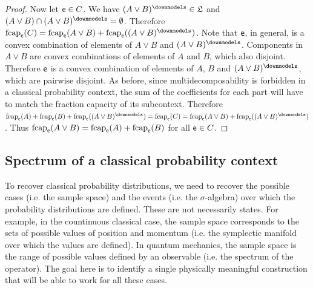 \begin{mathSection}
\begin{proof}
	Now let $\mathsf{e} \in C$. We have $(A \vee B)^\separate \in \mathfrak{L}$ and $(A \vee B) \cap (A \vee B)^\separate = \emptyset$. Therefore $\fcap_{\ens}(C) = \fcap_{\ens}(A \vee B)+ \fcap_{\ens}((A \vee B)^\separate)$. Note that $\mathsf{e}$, in general, is a convex combination of elements of $A\vee B$ and $(A \vee B)^\separate$. Components in $A \vee B$ are convex combinations of elements of $A$ and $B$, which also disjoint. Therefore $\mathsf{e}$ is a convex combination of elements of $A$, $B$ and $(A \vee B)^\separate$, which are pairwise disjoint. As before, since multidecomposability is forbidden in a classical probability context, the sum of the coefficients for each part will have to match the fraction capacity of its subcontext. Therefore $\fcap_{\ens}(A) +  \fcap_{\ens}(B) + \fcap_{\ens}((A \vee B)^\separate) = \fcap_{\ens}(C) = \fcap_{\ens}(A \vee B) + \fcap_{\ens}((A \vee B)^\separate)$. Thus $\mathrm{fcap}_{\mathsf{e}}(A \vee B) = \mathrm{fcap}_{\mathsf{e}}(A) +  \mathrm{fcap}_{\mathsf{e}}(B)$ for all $\mathsf{e} \in C$.
\end{proof}
\end{mathSection}

\subsection{Spectrum of a classical probability context}

To recover classical probability distributions, we need to recover the possible cases (i.e. the sample space) and the events (i.e. the $\sigma$-algebra) over which the probability distributions are defined. These are not necessarily states. For example, in the countinuous classical case, the sample space corresponds to the sets of possible values of position and momentum (i.e. the symplectic manifold over which the values are defined). In quantum mechanics, the sample space is the range of possible values defined by an observable (i.e. the spectrum of the operator). The goal here is to identify a single physically meaningful construction that will be able to work for all these cases.

